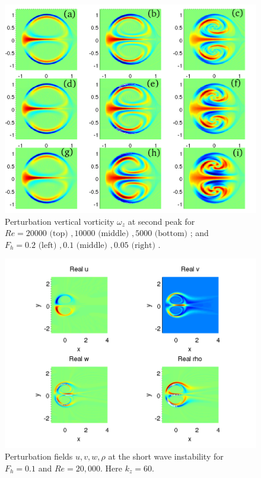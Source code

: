 \begin{figure}
\begin{center}
\includegraphics[width=\textwidth]{vorticity_second_peak}
\caption{Perturbation vertical vorticity $\omega_{z}$ at second peak for $Re=20000\text{ (top) }, 10000 \text{ (middle) }, 5000 \text{ (bottom) }$; and $F_{h}=0.2 \text{ (left) }, 0.1 \text{ (middle) }, 0.05 \text{ (right) }$.}
\label{secondpeak}
\end{center}
\end{figure}
\begin{figure}
\begin{center}
\includegraphics[width=\textwidth]{velocity_fields_kz_60}
\caption{Perturbation fields $u,v,w,\rho$ at the short wave instability for $F_{h}=0.1$ and $Re=20{,}000$. Here $k_{z}=60$.} 
\label{secondpeak_fields}
\end{center}
\end{figure} 
